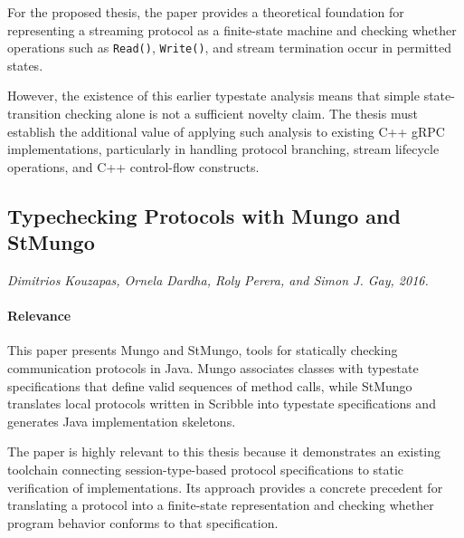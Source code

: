 For the proposed thesis, the paper provides a theoretical foundation for
representing a streaming protocol as a finite-state machine and checking
whether operations such as \texttt{Read()}, \texttt{Write()}, and stream
termination occur in permitted states.

However, the existence of this earlier typestate analysis means that
simple state-transition checking alone is not a sufficient novelty claim.
The thesis must establish the additional value of applying such analysis
to existing C++ gRPC implementations, particularly in handling protocol
branching, stream lifecycle operations, and C++ control-flow constructs.


\subsection{Typechecking Protocols with Mungo and StMungo}
\textit{Dimitrios Kouzapas, Ornela Dardha, Roly Perera, and Simon J. Gay, 2016.}

\paragraph{Relevance}
This paper presents Mungo and StMungo, tools for statically checking communication protocols in Java. Mungo associates classes with typestate specifications that define valid sequences of method calls, while StMungo translates local protocols written in Scribble into typestate specifications and generates Java implementation skeletons.

The paper is highly relevant to this thesis because it demonstrates an existing toolchain connecting session-type-based protocol specifications to static verification of implementations. Its approach provides a concrete precedent for translating a protocol into a finite-state representation and checking whether program behavior conforms to that specification.

